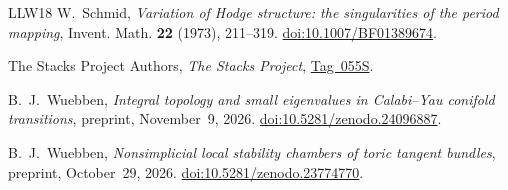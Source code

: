 \begin{thebibliography}{LLW18}
W.~Schmid,
\emph{Variation of Hodge structure: the singularities of the period mapping},
Invent. Math. \textbf{22} (1973), 211--319.
\href{https://doi.org/10.1007/BF01389674}
{doi:10.1007/BF01389674}.

The Stacks Project Authors, \emph{The Stacks Project},
\href{https://stacks.math.columbia.edu/tag/055S}{Tag~055S}.

B.~J.~Wuebben,
\emph{Integral topology and small eigenvalues in Calabi--Yau conifold
transitions}, preprint, November~9, 2026.
\href{https://doi.org/10.5281/zenodo.24096887}
{doi:10.5281/zenodo.24096887}.

B.~J.~Wuebben,
\emph{Nonsimplicial local stability chambers of toric tangent bundles},
preprint, October~29, 2026.
\href{https://doi.org/10.5281/zenodo.23774770}
{doi:10.5281/zenodo.23774770}.

\end{thebibliography}
